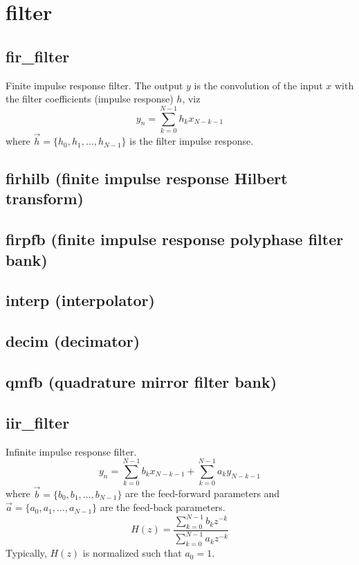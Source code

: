 % 
%
\section{filter}
\label{module:filter}

\subsection{fir\_filter}
Finite impulse response filter.
The output $y$ is the convolution of the input $x$ with the filter
coefficients (impulse response) $h$, viz
\[
    y_n = \sum_{k=0}^{N-1}{ h_k x_{N-k-1} }
\]
where $\vec{h} = \{h_0,h_1,\ldots,h_{N-1}\}$ is the filter impulse response.

\subsection{firhilb (finite impulse response Hilbert transform)}

\subsection{firpfb (finite impulse response polyphase filter bank)}

\subsection{interp (interpolator)}

\subsection{decim (decimator)}

\subsection{qmfb (quadrature mirror filter bank)}

\subsection{iir\_filter}
Infinite impulse response filter.
\[
    y_n = \sum_{k=0}^{N-1}{ b_k x_{N-k-1} } +
          \sum_{k=0}^{N-1}{ a_k y_{N-k-1} }
\]
where $\vec{b} = \{b_0,b_1,\ldots,b_{N-1}\}$ are the feed-forward parameters
and $\vec{a} = \{a_0,a_1,\ldots,a_{N-1}\}$ are the feed-back parameters.
\[
    H(z) = \frac{\sum_{k=0}^{N-1}{b_k z^{-k}}}
                {\sum_{k=0}^{N-1}{a_k z^{-k}}}
\]
Typically, $H(z)$ is normalized such that $a_0=1$.

